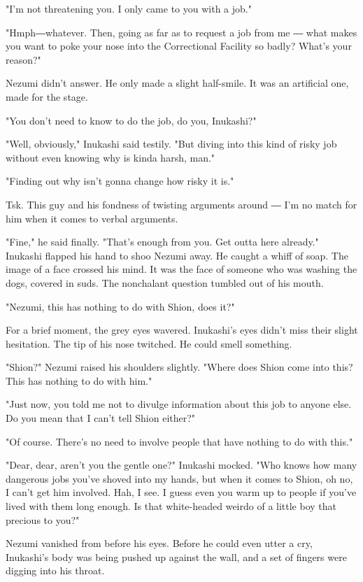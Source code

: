 "I'm not threatening you. I only came to you with a job."

"Hmph―whatever. Then, going as far as to request a job from me ― what
makes you want to poke your nose into the Correctional Facility so
badly? What's your reason?"

Nezumi didn't answer. He only made a slight half-smile. It was an
artificial one, made for the stage.

"You don't need to know to do the job, do you, Inukashi?"

"Well, obviously," Inukashi said testily. "But diving into this kind of
risky job without even knowing why is kinda harsh, man."

"Finding out why isn't gonna change how risky it is."

Tsk. This guy and his fondness of twisting arguments around ― I'm no
match for him when it comes to verbal arguments.

"Fine," he said finally. "That's enough from you. Get outta here
already." Inukashi flapped his hand to shoo Nezumi away. He caught a
whiff of soap. The image of a face crossed his mind. It was the face of
someone who was washing the dogs, covered in suds. The nonchalant
question tumbled out of his mouth.

"Nezumi, this has nothing to do with Shion, does it?"

For a brief moment, the grey eyes wavered. Inukashi's eyes didn't miss
their slight hesitation. The tip of his nose twitched. He could smell
something.

"Shion?" Nezumi raised his shoulders slightly. "Where does Shion come
into this? This has nothing to do with him."

"Just now, you told me not to divulge information about this job to
anyone else. Do you mean that I can't tell Shion either?"

"Of course. There's no need to involve people that have nothing to do
with this."

"Dear, dear, aren't you the gentle one?" Inukashi mocked. "Who knows how
many dangerous jobs you've shoved into my hands, but when it comes to
Shion, oh no, I can't get him involved. Hah, I see. I guess even you
warm up to people if you've lived with them long enough. Is that
white-headed weirdo of a little boy that precious to you?"

Nezumi vanished from before his eyes. Before he could even utter a cry,
Inukashi's body was being pushed up against the wall, and a set of
fingers were digging into his throat.

